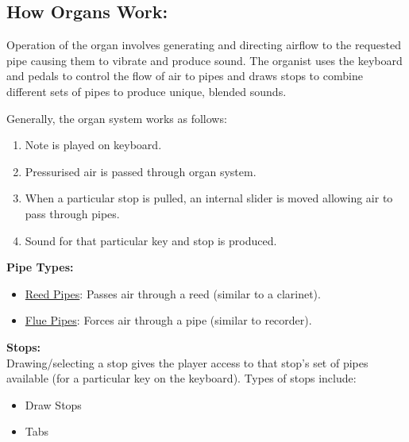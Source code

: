 \noindent \subsection{How Organs Work:}
\hspace{0.5cm} Operation of the organ involves generating and directing airflow to the requested pipe causing them to vibrate and produce sound. The organist uses the keyboard and pedals to control the flow of air to pipes and draws stops to combine different sets of pipes to produce unique, blended sounds.  \cite{organvideo}

\noindent Generally, the organ system works as follows:
\vspace{-0.15cm}
\begin{enumerate}
    \itemsep0em 
\item Note is played on keyboard.
\vspace{-0.1cm}
\item Pressurised air is passed through organ system.
\vspace{-0.1cm}
\item When a particular stop is pulled, an internal slider is moved allowing air to pass through pipes.
\vspace{-0.1cm}
\item Sound for that particular key and stop is produced.
\end{enumerate}
\vspace{-0.1cm}

\noindent \textbf{Pipe Types:}
\vspace{-0.15cm}
\begin{itemize}
    \itemsep0em 
\item \underline{Reed Pipes}: Passes air through a reed (similar to a clarinet).
\item \underline{Flue Pipes}: Forces air through a pipe (similar to recorder).
\end{itemize}
\vspace{-0.2cm}
\cite{organvideo}

\noindent \textbf{Stops:}
\\ \hspace*{0.5cm}Drawing/selecting a stop gives the player access to that stop's set of pipes available (for a particular key on the keyboard). Types of stops include:
\vspace{-0.15cm}
\begin{itemize}
    \itemsep0em 
\item Draw Stops
\vspace{-0.1cm}
\item Tabs
\end{itemize}
\vspace{-0.15cm}

